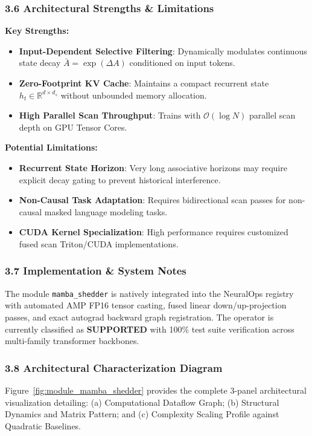 \subsubsection*{3.6 Architectural Strengths \& Limitations}
\textbf{Key Strengths:}
\begin{itemize}
    \item \textbf{Input-Dependent Selective Filtering}: Dynamically modulates continuous state decay $\bar{A} = \exp(\Delta A)$ conditioned on input tokens.
    \item \textbf{Zero-Footprint KV Cache}: Maintains a compact recurrent state $h_t \in \mathbb{R}^{d \times d_s}$ without unbounded memory allocation.
    \item \textbf{High Parallel Scan Throughput}: Trains with $\mathcal{O}(\log N)$ parallel scan depth on GPU Tensor Cores.
\end{itemize}

\textbf{Potential Limitations:}
\begin{itemize}
    \item \textbf{Recurrent State Horizon}: Very long associative horizons may require explicit decay gating to prevent historical interference.
    \item \textbf{Non-Causal Task Adaptation}: Requires bidirectional scan passes for non-causal masked language modeling tasks.
    \item \textbf{CUDA Kernel Specialization}: High performance requires customized fused scan Triton/CUDA implementations.
\end{itemize}

\subsubsection*{3.7 Implementation \& System Notes}
The module \texttt{mamba\_shedder} is natively integrated into the NeuralOps registry with automated AMP FP16 tensor casting, fused linear down/up-projection passes, and exact autograd backward graph registration. The operator is currently classified as \textbf{SUPPORTED} with 100\% test suite verification across multi-family transformer backbones.

\subsubsection*{3.8 Architectural Characterization Diagram}
Figure~\ref{fig:module_mamba_shedder} provides the complete 3-panel architectural visualization detailing: (a) Computational Dataflow Graph; (b) Structural Dynamics and Matrix Pattern; and (c) Complexity Scaling Profile against Quadratic Baselines.

